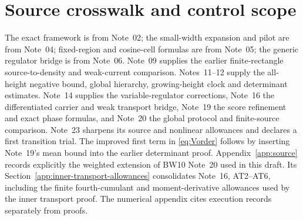 \section{Source crosswalk and control scope}\label{app:scope}
The exact framework is from Note~02; the small-width expansion and
pilot are from Note~04; fixed-region and cosine-cell formulas are from
Note~05; the generic regulator bridge is from Note~06.
Note~09 supplies the earlier finite-rectangle source-to-density and
weak-current comparison. Notes~11--12 supply the all-height negative
bound, global hierarchy, growing-height clock and determinant estimates.
Note~14 supplies the variable-regulator corrections, Note~16 the
differentiated carrier and weak transport bridge, Note~19 the score
refinement and exact phase formulas, and Note~20 the global protocol
and finite-source comparison. Note~23 sharpens its source and nonlinear
allowances and declares a first transition trial. The improved first term in
\eqref{eq:Vorder} follows by inserting Note~19's mean bound into the
earlier determinant proof.
Appendix~\ref{app:source} records explicitly the weighted extension
of BW10 Note~20 used in this draft. Its
Section~\ref{app:inner-transport-allowances} consolidates Note~16,
AT2--AT6, including the finite fourth-cumulant and moment-derivative
allowances used by the inner transport proof.
The numerical appendix cites execution records separately from proofs.

